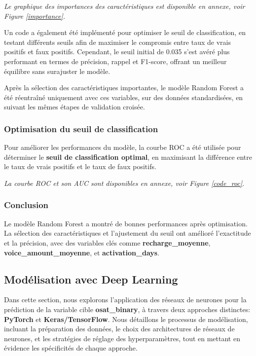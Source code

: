 \textit{Le graphique des importances des caractéristiques est disponible en annexe, voir Figure \ref{importance}.}

Un code a également été implémenté pour optimiser le seuil de classification, en testant différents seuils afin de maximiser le compromis entre taux de vrais positifs et faux positifs. Cependant, le seuil initial de 0.035 s'est avéré plus performant en termes de précision, rappel et F1-score, offrant un meilleur équilibre sans surajuster le modèle.

Après la sélection des caractéristiques importantes, le modèle Random Forest a été réentraîné uniquement avec ces variables, sur des données standardisées, en suivant les mêmes étapes de validation croisée.

\subsubsection{Optimisation du seuil de classification}
Pour améliorer les performances du modèle, la courbe ROC a été utilisée pour déterminer le \textbf{seuil de classification optimal}, en maximisant la différence entre le taux de vrais positifs et le taux de faux positifs.

\textit{La courbe ROC et son AUC sont disponibles en annexe, voir Figure \ref{code_roc}.}

\subsubsection{Conclusion}
Le modèle Random Forest a montré de bonnes performances après optimisation. La sélection des caractéristiques et l'ajustement du seuil ont amélioré l'exactitude et la précision, avec des variables clés comme \textbf{recharge\_moyenne}, \textbf{voice\_amount\_moyenne}, et \textbf{activation\_days}.

\subsection{Modélisation avec Deep Learning}
Dans cette section, nous explorons l'application des réseaux de neurones pour la prédiction de la variable cible \textbf{osat\_binary}, à travers deux approches distinctes: \textbf{PyTorch} et \textbf{Keras/TensorFlow}. Nous détaillons le processus de modélisation, incluant la préparation des données, le choix des architectures de réseaux de neurones, et les stratégies de réglage des hyperparamètres, tout en mettant en évidence les spécificités de chaque approche.

